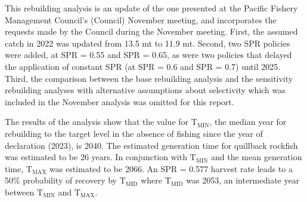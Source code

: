 \documentclass[11pt,
  english,
  letterpaper,
]{article}
\begin{document}
\leavevmode\tagmcend\tagstructend\par


This rebuilding analysis is an update of the one presented at the Pacific Fishery Management Council's (Council) November meeting, and incorporates the requests made by the Council during the November meeting. First, the assumed catch in 2022 was updated from 13.5 mt to 11.9 mt. Second, two SPR policies were added, at SPR = 0.55 and SPR = 0.65, as were two policies that delayed the application of constant SPR (at SPR = 0.6 and SPR = 0.7) until 2025. Third, the comparison between the base rebuilding analysis and the sensitivity rebuilding analyses with alternative assumptions about selectivity which was included in the November analysis was omitted for this report.

\leavevmode\tagmcend\tagstructend\par


The results of the analysis show that the value for {\(\text{T}_\text{MIN}\)\leavevmode\tagmcend\tagstructend}, the median year for rebuilding to the target level in the absence of fishing since the year of declaration (2023), is 2040. The estimated generation time for quillback rockfish was estimated to be 26 years. In conjunction with {\(\text{T}_\text{MIN}\)\leavevmode\tagmcend\tagstructend} and the mean generation time, {\(\text{T}_\text{MAX}\)\leavevmode\tagmcend\tagstructend} was estimated to be 2066. An SPR = 0.577 harvest rate leads to a 50\% probability of recovery by {\(\text{T}_\text{MID}\)\leavevmode\tagmcend\tagstructend} where {\(\text{T}_\text{MID}\)\leavevmode\tagmcend\tagstructend} was 2053, an intermediate year between {\(\text{T}_\text{MIN}\)\leavevmode\tagmcend\tagstructend} and {\(\text{T}_\text{MAX}\)\leavevmode\tagmcend\tagstructend}.

\leavevmode\tagmcend\tagstructend\par

\pagebreak
\setlength{\parskip}{5mm plus1mm minus1mm}
\setcounter{page}{1}
\renewcommand{\thefigure}{\arabic{figure}}
\renewcommand{\thetable}{\arabic{table}}
\setcounter{table}{0}
\setcounter{figure}{0}
\end{document}
